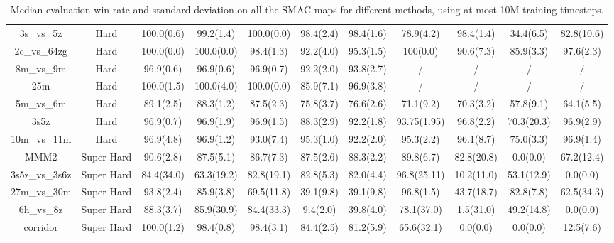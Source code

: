 \begin{table}
\begin{tabular}{ccccccccccc}
        3s\_vs\_5z &           Hard & 100.0(0.6) &  99.2(1.4) & 100.0(0.0) &  98.4(2.4) &  98.4(1.6) &   78.9(4.2) &  98.4(1.4) &  34.4(6.5) & 82.8(10.6) \\
      2c\_vs\_64zg &           Hard & 100.0(0.0) & 100.0(0.0) &  98.4(1.3) &  92.2(4.0) &  95.3(1.5) &    100(0.0) &  90.6(7.3) &  85.9(3.3) &  97.6(2.3) \\
        8m\_vs\_9m &           Hard &  96.9(0.6) &  96.9(0.6) &  96.9(0.7) &  92.2(2.0) &  93.8(2.7) &           / &          / &          / &          / \\
             25m &           Hard & 100.0(1.5) & 100.0(4.0) & 100.0(0.0) &  85.9(7.1) &  96.9(3.8) &           / &          / &          / &          / \\
        5m\_vs\_6m &           Hard &  89.1(2.5) &  88.3(1.2) &  87.5(2.3) &  75.8(3.7) &  76.6(2.6) &   71.1(9.2) &  70.3(3.2) &  57.8(9.1) &  64.1(5.5) \\
            3s5z &           Hard &  96.9(0.7) &  96.9(1.9) &  96.9(1.5) &  88.3(2.9) &  92.2(1.8) & 93.75(1.95) &  96.8(2.2) & 70.3(20.3) &  96.9(2.9) \\
      10m\_vs\_11m &           Hard &  96.9(4.8) &  96.9(1.2) &  93.0(7.4) &  95.3(1.0) &  92.2(2.0) &   95.3(2.2) &  96.1(8.7) &  75.0(3.3) &  96.9(1.4) \\
            MMM2 &     Super Hard &  90.6(2.8) &  87.5(5.1) &  86.7(7.3) &  87.5(2.6) &  88.3(2.2) &   89.8(6.7) & 82.8(20.8) &   0.0(0.0) & 67.2(12.4) \\
    3s5z\_vs\_3s6z &     Super Hard & 84.4(34.0) & 63.3(19.2) & 82.8(19.1) &  82.8(5.3) &  82.0(4.4) & 96.8(25.11) & 10.2(11.0) & 53.1(12.9) &   0.0(0.0) \\
      27m\_vs\_30m &     Super Hard &  93.8(2.4) &  85.9(3.8) & 69.5(11.8) &  39.1(9.8) &  39.1(9.8) &   96.8(1.5) & 43.7(18.7) &  82.8(7.8) & 62.5(34.3) \\
        6h\_vs\_8z &     Super Hard &  88.3(3.7) & 85.9(30.9) & 84.4(33.3) &   9.4(2.0) &  39.8(4.0) &  78.1(37.0) &  1.5(31.0) & 49.2(14.8) &   0.0(0.0) \\
        corridor &     Super Hard & 100.0(1.2) &  98.4(0.8) &  98.4(3.1) &  84.4(2.5) &  81.2(5.9) &  65.6(32.1) &   0.0(0.0) &   0.0(0.0) &  12.5(7.6) \\
\bottomrule
\end{tabular}
\centering
\caption{Median evaluation win rate and standard deviation on all the SMAC maps for different methods, using at most 10M training timesteps.
} 
\label{tab:app-SMAC-results-all}
\vspace{-4mm}
\end{table}

